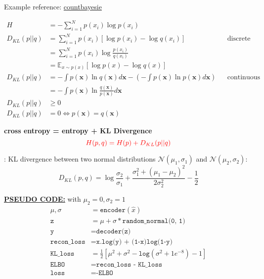 Example reference: 	\href{https://www.countbayesie.com/blog/2017/5/9/kullback-leibler-divergence-explained}{countbayesie}

\begin{align}
	H &= - \sum_{i=1}^{N} p(x_i) \log p(x_i)\\
	D_{KL}(p || q) &= \sum_{i=1}^N p(x_i) \left[ \log p(x_i) - \log q(x_i) \right] &&\text{discrete case}\\
	&= \sum_{i=1}^N p(x_i) \log \frac{p(x_i)}{q(x_i)}\\
	&= \mathbb{E}_{x \sim p(x)} \left[ \log p(x) - \log q(x) \right]\\
	D_{KL}(p || q) &= - \int p(\textbf{x}) \ln q(\textbf{x}) d\textbf{x} - \left( -\int p(\textbf{x}) \ln p(\textbf{x}) d\textbf{x} \right) &&\text{continuous case}\\
	&= - \int p(\textbf{x}) \ln \frac{q(\textbf{x})}{p(\textbf{x})} d\textbf{x}\\
	D_{KL}(p || q) & \geq 0\\
	D_{KL}(p || q) & = 0 \iff p(\textbf{x}) = q(\textbf{x})
\end{align}

\textbf{\color{red} cross entropy = entropy + KL Divergence}
\begin{equation}
	{\color{red} H(p, q) = H(p) + D_{KL}(p || q)}
\end{equation}

\Eg: KL divergence between two normal distributions $\mathcal{N}(\mu_1, \sigma_1)$ and $\mathcal{N}(\mu_2, \sigma_2)$:
\begin{equation}
	D_{KL}(p, q) = \log \frac{\sigma_2}{\sigma_1} + \frac{\sigma_1^2 + (\mu_1 - \mu_2)^2}{2 \sigma_2^2} - \frac{1}{2}
\end{equation}

\underline{\textbf{PSEUDO CODE:}} with $\mu_2=0, \sigma_2 = 1$
\begin{align}
	\mu, \sigma &= \texttt{encoder}(\hat{x})\\
	\texttt{z} &= \mu + \sigma * \texttt{random\_normal(0, 1)}\\
	\texttt{y} &= \texttt{decoder(z)}\\
	\texttt{recon\_loss} &= \texttt{x.log(y) + (1-x)log(1-y)}\\
	\texttt{KL\_loss} &= \frac{1}{2} [ \mu^2 + \sigma^2 - \texttt{log}(\sigma^2 + 1e^{-8}) -1 ]\\
	\texttt{ELBO} &= \texttt{recon\_loss - KL\_loss}\\
	\texttt{loss} &= \texttt{-ELBO}
\end{align}

